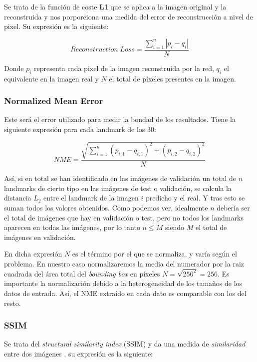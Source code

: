             \medskip

            \noindent Se trata de la función de coste \textbf{L1} que se aplica a la imagen original y la reconstruida  y nos porporciona una medida del error de reconstrucción a nivel de pixel. Su expresión es la siguiente:

            \begin{equation}
                Reconstruction \; Loss = \frac{\sum_{i=1}^n |p_i -q_i|}{N}
            \end{equation}

            \noindent Donde $p_i$ representa cada pixel de la imagen reconstruida por la red, $q_i$ el equivalente en la imagen real y $N$ el total de píxeles presentes en la imagen.

        \subsubsection{Normalized Mean Error}
            \noindent Este será el error utilizado para medir la bondad de los resultados. Tiene la siguiente expresión para cada landmark de los $30$: 

            \begin{equation}
                NME=\frac{\sqrt{\sum_{i=1}^{n}(p_{i,1} -q_{i,1})^2+ (p_{i,2} -q_{i,2})^2}}{N}
            \end{equation}


            \noindent Así, si en total se han identificado en las imágenes de validación un total de $n$ landmarks de cierto tipo en las imágenes de test o validación, se calcula la distancia $L_2$ entre el landmark de la imagen $i$ predicho y el real. Y tras esto se suman todos los valores obtenidos. Como podemos ver, idealmente $n$ debería ser el total de imágenes que hay en validación o test, pero no todos los landmarks aparecen en todas las imágenes, por lo tanto $n\leq M$ siendo $M$ el total de imágenes en validación.

            \noindent En dicha expresión $N$ es el término por el que se normaliza, y varía según el problema. En nuestro caso normalizaremos la media del numerador por la raiz cuadrada del área total del \textit{bounding box} en píxeles $N=\sqrt{256^2}=256$. Es importante la normalización debido a la heterogeneidad de los tamaños de los datos de entrada. Así, el NME extraído en cada dato es comparable con los del resto.

            \subsubsection{SSIM}
            \noindent Se trata del \textit{structural similarity index} (SSIM) y da una medida de \textit{similaridad} entre dos imágenes \cite{wang2004image}, su expresión es la siguiente: 

